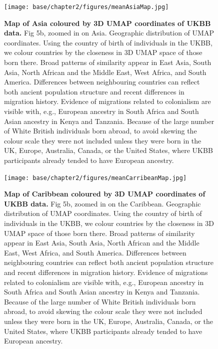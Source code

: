 \begin{figure}[ht]
    \centering
    \texttt{[image: base/chapter2/figures/meanAsiaMap.jpg]}
    \caption[Map of Asia coloured by 3D UMAP coordinates of UKBB data]{\textbf{Map of Asia coloured by 3D UMAP coordinates of UKBB data.} Fig 5b, zoomed in on Asia. Geographic distribution of UMAP coordinates. Using the country of birth of individuals in the UKBB, we colour countries by the closeness in 3D UMAP space of those born there. Broad patterns of similarity appear in East Asia, South Asia, North African and the Middle East, West Africa, and South America. Differences between neighbouring countries can reflect both ancient population structure and recent differences in migration history. Evidence of migrations related to colonialism are visible with, e.g., European ancestry in South Africa and South Asian ancestry in Kenya and Tanzania. Because of the large number of White British individuals born abroad, to avoid skewing the colour scale they were not included unless they were born in the UK, Europe, Australia, Canada, or the United States, where UKBB participants already tended to have European ancestry.}
    \label{fig:supp_umap_ukbb_asia}
\end{figure}

\newpage

\begin{figure}[ht]
    \centering
    \texttt{[image: base/chapter2/figures/meanCarribeanMap.jpg]}
    \caption[Map of Caribbean coloured by 3D UMAP coordinates of UKBB data]{\textbf{Map of Caribbean coloured by 3D UMAP coordinates of UKBB data.} Fig 5b, zoomed in on the Caribbean. Geographic distribution of UMAP coordinates. Using the country of birth of individuals in the UKBB, we colour countries by the closeness in 3D UMAP space of those born there. Broad patterns of similarity appear in East Asia, South Asia, North African and the Middle East, West Africa, and South America. Differences between neighbouring countries can reflect both ancient population structure and recent differences in migration history. Evidence of migrations related to colonialism are visible with, e.g., European ancestry in South Africa and South Asian ancestry in Kenya and Tanzania. Because of the large number of White British individuals born abroad, to avoid skewing the colour scale they were not included unless they were born in the UK, Europe, Australia, Canada, or the United States, where UKBB participants already tended to have European ancestry.}
    \label{fig:supp_umap_ukbb_car}
\end{figure}

